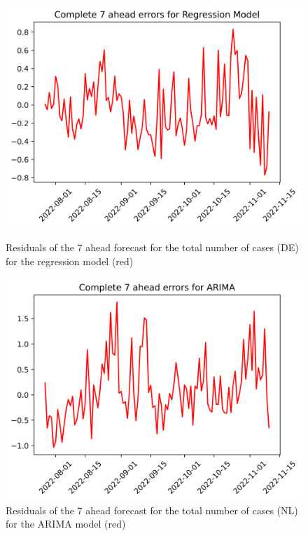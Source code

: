 \begin{figure}

\begin{minipage}{.32\textwidth}
  \centering
  \includegraphics[width=\linewidth]{pics/7_ah/DE_7_ahead_errors_Regression Model.png}
  \caption{Residuals of the 7 ahead forecast for the total number of cases (DE) for the regression model (red)}
  \label{fig:tot_cases_error_7_RM_DE}
\end{minipage}
\begin{minipage}{.32\textwidth}
  \centering
  \includegraphics[width=\linewidth]{pics/7_ah/7_ahead_errors_ARIMA.png}
  \caption{Residuals of the 7 ahead forecast for the total number of cases (NL) for the ARIMA model (red)}
  \label{fig:tot_cases_error_7_ARIMA}

\end{minipage}
\end{figure}
